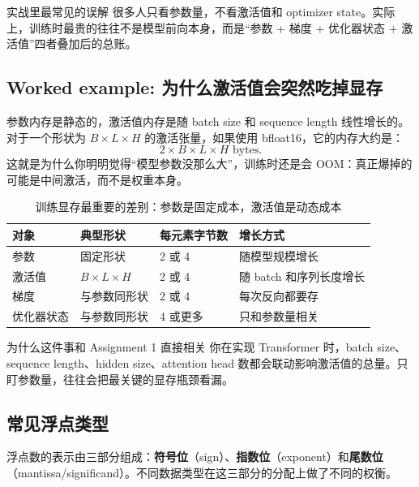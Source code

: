 \documentclass[a4paper]{article}
\begin{document}
\begin{importantbox}{实战里最常见的误解}
很多人只看参数量，不看激活值和 optimizer state。实际上，训练时最贵的往往不是模型前向本身，而是“参数 + 梯度 + 优化器状态 + 激活值”四者叠加后的总账。
\end{importantbox}

\subsection{Worked example: 为什么激活值会突然吃掉显存}

参数内存是静态的，激活值内存是随 batch size 和 sequence length 线性增长的。对于一个形状为 \(B\times L\times H\) 的激活张量，如果使用 bfloat16，它的内存大约是：
\[
2 \times B \times L \times H \text{ bytes}.
\]
这就是为什么你明明觉得“模型参数没那么大”，训练时还是会 OOM：真正爆掉的可能是中间激活，而不是权重本身。

\begin{table}[H]
\centering
\begin{tabular}{p{}p{}p{}p{}}
\toprule
\textbf{对象} & \textbf{典型形状} & \textbf{每元素字节数} & \textbf{增长方式} \\
\midrule
参数 & 固定形状 & 2 或 4 & 随模型规模增长 \\
激活值 & \(B\times L\times H\) & 2 或 4 & 随 batch 和序列长度增长 \\
梯度 & 与参数同形状 & 2 或 4 & 每次反向都要存 \\
优化器状态 & 与参数同形状 & 4 或更多 & 只和参数量相关 \\
\bottomrule
\end{tabular}
\caption{训练显存最重要的差别：参数是固定成本，激活值是动态成本}
\end{table}

\begin{importantbox}{为什么这件事和 Assignment 1 直接相关}
你在实现 Transformer 时，batch size、sequence length、hidden size、attention head 数都会联动影响激活值的总量。只盯参数量，往往会把最关键的显存瓶颈看漏。
\end{importantbox}

\subsection{常见浮点类型}

浮点数的表示由三部分组成：\textbf{符号位}（sign）、\textbf{指数位}（exponent）和\textbf{尾数位}（mantissa/significand）。不同数据类型在这三部分的分配上做了不同的权衡。
\end{document}
